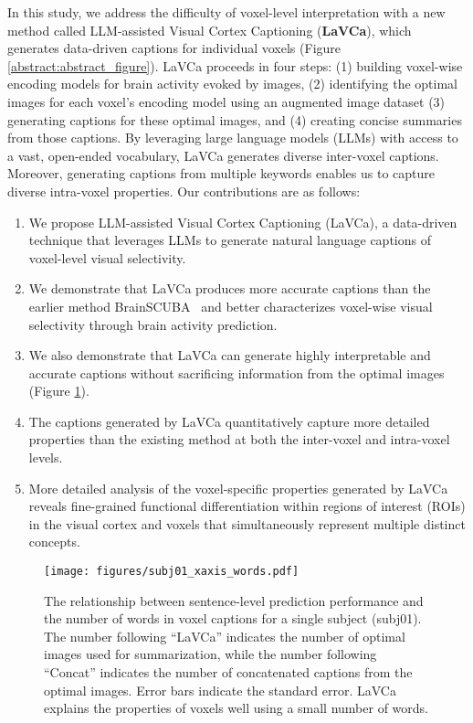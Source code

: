 In this study, we address the difficulty of voxel-level interpretation with a new method called LLM-assisted Visual Cortex Captioning (\textbf{LaVCa}), which generates data-driven captions for individual voxels (Figure \ref{abstract:abstract_figure}). LaVCa proceeds in four steps: (1) building voxel-wise encoding models for brain activity evoked by images, (2) identifying the optimal images for each voxel’s encoding model using an augmented image dataset (3) generating captions for these optimal images, and (4) creating concise summaries from those captions. By leveraging large language models (LLMs) with access to a vast, open-ended vocabulary, LaVCa generates diverse inter-voxel captions. Moreover, generating captions from multiple keywords enables us to capture diverse intra-voxel properties.
Our contributions are as follows:
\begin{enumerate} 
\item We propose LLM-assisted Visual Cortex Captioning (LaVCa), a data-driven technique that leverages LLMs to generate natural language captions of voxel-level visual selectivity.

\item We demonstrate that LaVCa produces more accurate captions than the earlier method BrainSCUBA~\cite{luo2023brainscuba} and better characterizes voxel-wise visual selectivity through brain activity prediction.

\item We also demonstrate that LaVCa can generate highly interpretable and accurate captions without sacrificing information from the optimal images (Figure \ref{results:xaxis_num_words}).

\item The captions generated by LaVCa quantitatively capture more detailed properties than the existing method at both the inter-voxel and intra-voxel levels. 

\item More detailed analysis of the voxel-specific properties generated by LaVCa reveals fine-grained functional differentiation within regions of interest (ROIs) in the visual cortex and voxels that simultaneously represent multiple distinct concepts.

\end{enumerate}
\begin{figure}[b!] %
  \centering
  \texttt{[image: figures/subj01\_xaxis\_words.pdf]}
  \vskip 0.1in %
  \caption{The relationship between sentence-level prediction performance and the number of words in voxel captions for a single subject (subj01). The number following ``LaVCa'' indicates the number of optimal images used for summarization, while the number following ``Concat'' indicates the number of concatenated captions from the optimal images. Error bars indicate the standard error. LaVCa explains the properties of voxels well using a small number of words.}
  \label{results:xaxis_num_words}
\end{figure}
